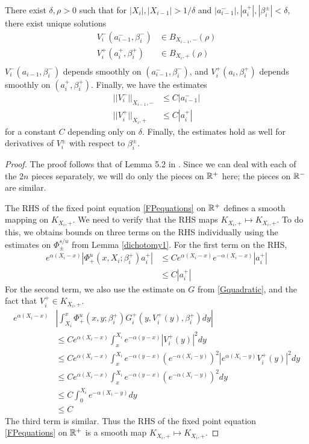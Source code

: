 \documentclass[thesis.tex]{subfiles}
\begin{document}
\begin{lemma}\label{solveforV}
There exist $\delta, \rho > 0$ such that for $|X_i|, |X_{i-1}| > 1/\delta$ and $|a_{i-1}^-|, |a_i^+|, |\beta_i^\pm| < \delta$, there exist unique solutions
\begin{align*}
V_i^-(a_{i-1}^-, \beta_i^-) &\in B_{X_{i-1}, -}(\rho) \\
V_i^+(a_i^+, \beta_i^+) &\in B_{X_i, +}(\rho) \\
\end{align*}
$V_i^-(a_{i-1}, \beta_i^-)$ depends smoothly on $(a_{i-1}^-, \beta_i^-)$, and $V_i^+(a_i, \beta_i^+)$ depends smoothly on $(a_i^+, \beta_i^+)$. Finally, we have the estimates
\begin{align*}
||V_i^-||_{X_{i-1}, -} &\leq C |a_{i-1}^-| \\
||V_i^+||_{X_i, +} &\leq C |a_i^+|
\end{align*}
for a constant $C$ depending only on $\delta$. Finally, the estimates hold as well for derivatives of $V_i^\pm$ with respect to $\beta_i^\pm$.
\begin{proof}
The proof follows that of Lemma 5.2 in \cite{Sandstede1997}. Since we can deal with each of the $2n$ pieces separately, we will do only the pieces on ${\mathbb R}^+$ here; the pieces on ${\mathbb R}^-$ are similar.

The RHS of the fixed point equation \eqref{FPequations} on ${\mathbb R}^+$ defines a smooth mapping on $K_{X_i, +}$. We need to verify that the RHS maps $K_{X_i, +} \mapsto K_{X_i, +}$. To do this, we obtains bounds on three terms on the RHS individually using the estimates on $\Phi^{s/u}_\pm$ from Lemma \ref{dichotomy1}. For the first term on the RHS,
\begin{align*}
e^{\alpha(X_i - x)} | \Phi^u_+(x, X_i; \beta_i^+) a_i^+ | 
&\leq C e^{\alpha(X_i - x)} e^{-\alpha(X_i - x)} |a_i^+| \\
&\leq C |a_i^+|
\end{align*}
For the second term, we also use the estimate on $G$ from \eqref{Gquadratic}, and the fact that $V_i^+ \in K_{X_i, +}$. 
\begin{align*}
e^{\alpha(X_i - x)} &\left| \int_{X_i}^x \Phi_+^u(x, y; \beta_i^+) G_i^+(y, V_i^+(y),\beta_i^+)dy  \right| \\
&\leq C e^{\alpha(X_i - x)} \int_x^{X_i} e^{-\alpha(y - x)}|V_i^+(y)|^2 dy \\
&\leq C e^{\alpha(X_i - x)} \int_x^{X_i} 
e^{-\alpha(y - x)}(e^{-\alpha(X_i - y)})^2|e^{\alpha(X_i - y)} V_i^+(y)|^2 dy \\
&\leq C e^{\alpha(X_i - x)} \int_x^{X_i} 
e^{-\alpha(y - x)}(e^{-\alpha(X_i - y)})^2 dy \\
&\leq C \int_0^{X_i} e^{-\alpha (X_i - y)} dy \\
&\leq C
\end{align*}
The third term is similar. Thus the RHS of the fixed point equation \eqref{FPequations} on ${\mathbb R}^+$ is a smooth map $K_{X_i, +} \mapsto K_{X_i, +}$. 


\end{proof}
\end{lemma}
\end{document}
